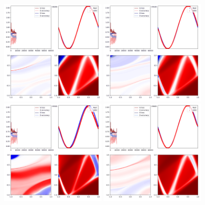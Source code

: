 \documentclass[lang=cn,11pt]{elegantpaper}
\begin{document}
\begin{figure}[hbt]
  \includegraphics[width=0.45\textwidth]{sin_4_1}
  \includegraphics[width=0.45\textwidth]{sin_4_2}
  \includegraphics[width=0.45\textwidth]{sin_4_3}
  \includegraphics[width=0.45\textwidth]{sin_4_4}
  \caption{}
\end{figure}
\end{document}
